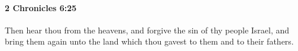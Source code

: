 
		\paragraph{2 Chronicles 6:25} %
			\label{2CHRONICLES-6-25}

			Then hear thou from the heavens, and forgive the sin of thy people Israel, and bring them again unto the land which thou gavest to them and to their fathers.


